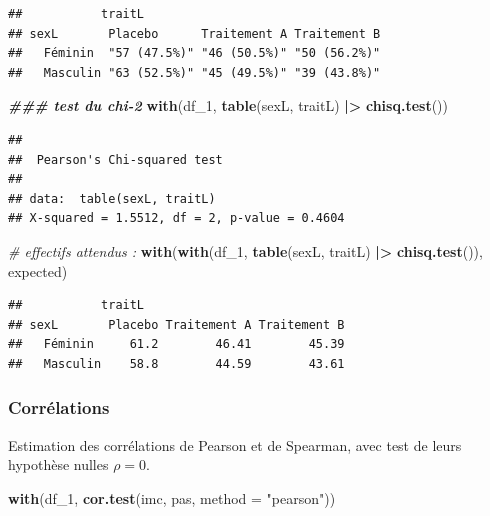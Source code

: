 \documentclass[
]{book}
\newenvironment{Shaded}{\begin{snugshade}}{\end{snugshade}}
\newcommand{\AttributeTok}[1]{\textcolor[rgb]{0.13,0.29,0.53}{#1}}
\newcommand{\CommentTok}[1]{\textcolor[rgb]{0.56,0.35,0.01}{\textit{#1}}}
\newcommand{\DocumentationTok}[1]{\textcolor[rgb]{0.56,0.35,0.01}{\textbf{\textit{#1}}}}
\newcommand{\FunctionTok}[1]{\textcolor[rgb]{0.13,0.29,0.53}{\textbf{#1}}}
\newcommand{\NormalTok}[1]{#1}
\newcommand{\SpecialCharTok}[1]{\textcolor[rgb]{0.81,0.36,0.00}{\textbf{#1}}}
\newcommand{\StringTok}[1]{\textcolor[rgb]{0.31,0.60,0.02}{#1}}
\begin{document}
\begin{verbatim}
##           traitL
## sexL       Placebo      Traitement A Traitement B
##   Féminin  "57 (47.5%)" "46 (50.5%)" "50 (56.2%)"
##   Masculin "63 (52.5%)" "45 (49.5%)" "39 (43.8%)"
\end{verbatim}

\begin{Shaded}
\begin{Highlighting}[]
\DocumentationTok{\#\#\# test du chi{-}2}
\FunctionTok{with}\NormalTok{(df\_1, }
     \FunctionTok{table}\NormalTok{(sexL, traitL) }\SpecialCharTok{|\textgreater{}}
       \FunctionTok{chisq.test}\NormalTok{())}
\end{Highlighting}
\end{Shaded}

\begin{verbatim}
## 
##  Pearson's Chi-squared test
## 
## data:  table(sexL, traitL)
## X-squared = 1.5512, df = 2, p-value = 0.4604
\end{verbatim}

\begin{Shaded}
\begin{Highlighting}[]
\CommentTok{\# effectifs attendus :}
\FunctionTok{with}\NormalTok{(}\FunctionTok{with}\NormalTok{(df\_1, }
          \FunctionTok{table}\NormalTok{(sexL, traitL) }\SpecialCharTok{|\textgreater{}}
            \FunctionTok{chisq.test}\NormalTok{()),}
\NormalTok{     expected)}
\end{Highlighting}
\end{Shaded}

\begin{verbatim}
##           traitL
## sexL       Placebo Traitement A Traitement B
##   Féminin     61.2        46.41        45.39
##   Masculin    58.8        44.59        43.61
\end{verbatim}

\subsubsection{Corrélations}\label{corruxe9lations-1}

Estimation des corrélations de Pearson et de Spearman, avec test de leurs hypothèse nulles \(\rho = 0\).

\begin{Shaded}
\begin{Highlighting}[]
\FunctionTok{with}\NormalTok{(df\_1,}
     \FunctionTok{cor.test}\NormalTok{(imc, pas, }\AttributeTok{method =} \StringTok{"pearson"}\NormalTok{))}
\end{Highlighting}
\end{Shaded}
\end{document}
